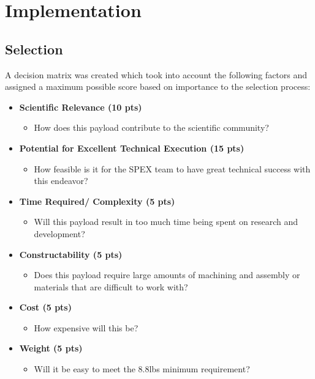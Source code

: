 \documentclass[conference]{IEEEtran} %
\begin{document}
\section{Implementation}
\label{sec:Implementation}

\subsection{Selection}
\label{subsec:Selection}
A decision matrix was created which took into account the following factors and assigned a maximum possible
score based on importance to the selection process:
\begin{itemize}
  \item \textbf{Scientific Relevance (10 pts)}
  \begin{itemize}
    \item How does this payload contribute to the scientific community?
  \end{itemize}

  \item \textbf{Potential for Excellent Technical Execution (15 pts)}
  \begin{itemize}
    \item How feasible is it for the SPEX team to have great technical success with this endeavor?
  \end{itemize}

  \item \textbf{Time Required/ Complexity (5 pts)}
  \begin{itemize}
    \item Will this payload result in too much time being spent on research and development?
  \end{itemize}

  \item \textbf{Constructability (5 pts)}
  \begin{itemize}
    \item Does this payload require large amounts of machining and assembly or materials that are difficult to work with?
  \end{itemize}

  \item \textbf{Cost (5 pts)}
  \begin{itemize}
    \item How expensive will this be?
  \end{itemize}

  \item \textbf{Weight (5 pts)}
  \begin{itemize}
    \item Will it be easy to meet the 8.8lbs minimum requirement?
  \end{itemize}


\end{itemize}
\end{document}
